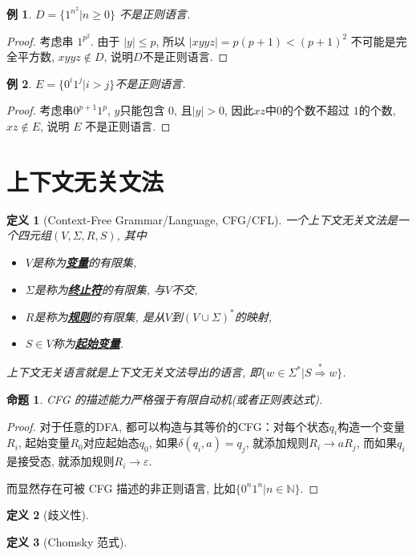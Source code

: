 \documentclass[8pt]{article}
\theoremstyle{compact}
\newtheorem{definition}{定义}
\newtheorem{proposition}{命题}
\newtheorem{example}{例}
\def\obj#1{\textbf{\uline{#1}}}
\def\le{\leqslant}
\def\ge{\geqslant}
\begin{document}
\begin{example}
	$D = \{1^{n^2} | n \ge 0\}$ 不是正则语言.
\end{example}
\begin{proof}
	考虑串 $1^{p^2}$. 由于 $|y| \le p$, 所以 $|xyyz| = p(p+1) < (p+1)^2$ 不可能是完全平方数, $xyyz \notin D$, 说明$D$不是正则语言.
\end{proof}
\begin{example}
	$E = \{0^i1^j | i > j\}$不是正则语言. 
\end{example}
\begin{proof}
	考虑串$0^{p+1}1^p$, $y$只能包含 $0$, 且$|y| > 0$, 因此$xz$中$0$的个数不超过 $1$的个数, $xz \notin E$, 说明 $E$ 不是正则语言.
\end{proof}
\newpage
\section{上下文无关文法}
\begin{definition}[Context-Free Grammar/Language, CFG/CFL]
	一个上下文无关文法是一个四元组$(V, \Sigma, R, S)$, 其中
	\begin{itemize}
		\item $V$是称为\obj{变量}的有限集, 
		\item $\Sigma$是称为\obj{终止符}的有限集, 与$V$不交, 
		\item $R$是称为\obj{规则}的有限集, 是从$V$到$(V \cup \Sigma)^*$的映射, 
		\item $S \in V$称为\obj{起始变量}. 
	\end{itemize}

	上下文无关语言就是上下文无关文法导出的语言, 即$\{w \in \Sigma^* | S \overset{*}{\Rightarrow} w\}$. 
\end{definition}
\begin{proposition}
	CFG 的描述能力严格强于有限自动机(或者正则表达式). 
\end{proposition}
\begin{proof}
	对于任意的DFA, 都可以构造与其等价的CFG：对每个状态$q_i$构造一个变量$R_i$, 起始变量$R_0$对应起始态$q_0$, 如果$\delta(q_i, a) = q_j$, 就添加规则$R_i \to aR_j$, 而如果$q_i$是接受态, 就添加规则$R_i \to \varepsilon$. 

	而显然存在可被 CFG 描述的非正则语言, 比如$\{0^n1^n | n \in \mathbb N\}$. 
\end{proof}
\begin{definition}[歧义性]
	
\end{definition}
\begin{definition}[Chomsky 范式]
	
\end{definition}
\end{document}
